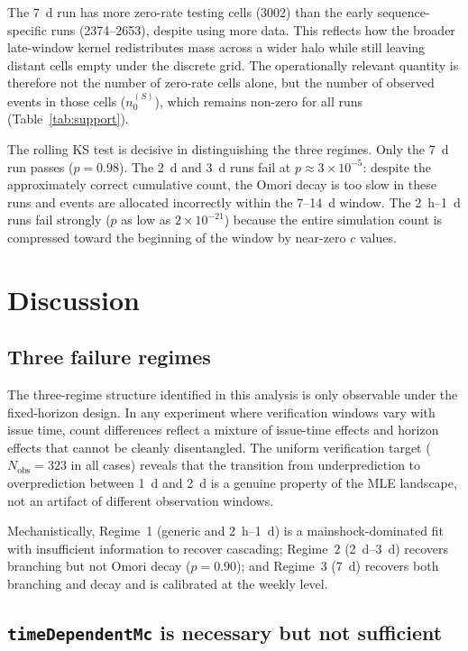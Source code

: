 \documentclass[12pt,letterpaper]{article}
\begin{document}
The 7~d run has more zero-rate testing cells (3002) than the early
sequence-specific runs (2374--2653), despite using more data. This reflects
how the broader late-window kernel redistributes mass across a wider halo while
still leaving distant cells empty under the discrete grid. The operationally
relevant quantity is therefore not the number of zero-rate cells alone, but the
number of observed events in those cells ($n^{(S)}_0$), which remains non-zero
for all runs (Table~\ref{tab:support}).

The rolling KS test is decisive in distinguishing the three regimes. Only the
7~d run passes ($p=0.98$). The 2~d and 3~d runs fail at $p\approx3\times10^{-5}$:
despite the approximately correct cumulative count, the Omori decay is too slow
in these runs and events are allocated incorrectly within the 7--14~d window.
The 2~h--1~d runs fail strongly ($p$ as low as $2\times10^{-21}$)
because the entire simulation count is compressed toward the beginning of the
window by near-zero $c$ values.

\section{Discussion}

\subsection{Three failure regimes}

The three-regime structure identified in this analysis is only observable under
the fixed-horizon design. In any experiment where verification windows vary with
issue time, count differences reflect a mixture of issue-time effects and
horizon effects that cannot be cleanly disentangled. The uniform verification
target ($N_{\mathrm{obs}}=323$ in all cases) reveals that the transition from
underprediction to overprediction between 1~d and 2~d is a genuine property of
the MLE landscape, not an artifact of different observation windows.

Mechanistically, Regime~1 (generic and 2~h--1~d) is a mainshock-dominated fit
with insufficient information to recover cascading; Regime~2 (2~d--3~d)
recovers branching but not Omori decay ($p=0.90$); and Regime~3 (7~d) recovers
both branching and decay and is calibrated at the weekly level.

\subsection{\texttt{timeDependentMc} is necessary but not sufficient}
\end{document}
